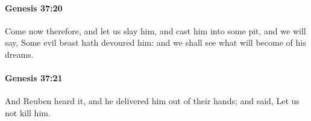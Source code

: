 		\paragraph{Genesis 37:20} %
			\label{GENESIS-37-20}

			Come now therefore, and let us slay him, and cast him into some pit, and we will say, Some evil beast hath devoured him: and we shall see what will become of his dreams.


		\paragraph{Genesis 37:21} %
			\label{GENESIS-37-21}

			And Reuben heard it, and he delivered him out of their hands; and said, Let us not kill him.


